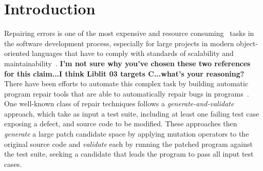 \documentclass[conference]{IEEEtran}
\newcommand{\todo}[1]
  {{\scriptsize \textbf{\color{red} {#1}}}}
\begin{document}
\section{Introduction} \label{introduction}



Repairing errors is one of the most expensive\cite{Tassey02,Britton13} and 
resource consuming~\cite{Weiss07} tasks in 
the software development process, especially for large projects in modern 
object-oriented languages that have to comply with standards of scalability and 
maintainability~\cite{Liblit03,Anvik05}. \todo{I'm not sure why you've chosen these two references for this claim...I think Liblit 03 targets C...what's your reasoning?}
%
There have been efforts to automate this complex task by 
building automatic program repair tools that are able to automatically repair 
bugs in programs~\cite{legoues12,kim2013,Weimer13,fan15,long15,debroy10,perkins09,wei10}. One well-known class of repair techniques follows a 
\emph{generate-and-validate} approach, which take as input a test suite, including at
least one failing test case exposing
a defect, and source code to be 
modified.  These approaches then \emph{generate} a large patch candidate space by applying 
mutation operators to the original source code and \emph{validate} each by
running the patched  program against the test suite, seeking a candidate that
leads the program to pass all input test cases. 
\end{document}
